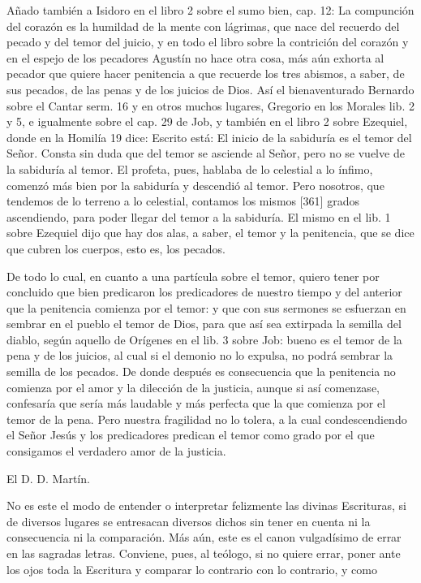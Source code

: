 Añado también a Isidoro en el libro 2 sobre el sumo bien, cap. 12: La compunción del corazón es la humildad de la mente con lágrimas, que nace del recuerdo del pecado y del temor del juicio, y en todo el libro sobre la contrición del corazón y en el espejo de los pecadores Agustín no hace otra cosa, más aún exhorta al pecador que quiere hacer penitencia a que recuerde los tres abismos, a saber, de sus pecados, de las penas y de los juicios de Dios. Así el bienaventurado Bernardo sobre el Cantar serm. 16 y en otros muchos lugares, Gregorio en los Morales lib. 2 y 5, e igualmente sobre el cap. 29 de Job, y también en el libro 2 sobre Ezequiel, donde en la Homilía 19 dice: Escrito está: El inicio de la sabiduría es el temor del Señor. Consta sin duda que del temor se asciende al Señor, pero no se vuelve de la sabiduría al temor. El profeta, pues, hablaba de lo celestial a lo ínfimo, comenzó más bien por la sabiduría y descendió al temor. Pero nosotros, que tendemos de lo terreno a lo celestial, contamos los mismos [361] grados ascendiendo, para poder llegar del temor a la sabiduría. El mismo en el lib. 1 sobre Ezequiel dijo que hay dos alas, a saber, el temor y la penitencia, que se dice que cubren los cuerpos, esto es, los pecados.

De todo lo cual, en cuanto a una partícula sobre el temor, quiero tener por concluido que bien predicaron los predicadores de nuestro tiempo y del anterior que la penitencia comienza por el temor: y que con sus sermones se esfuerzan en sembrar en el pueblo el temor de Dios, para que así sea extirpada la semilla del diablo, según aquello de Orígenes en el lib. 3 sobre Job: bueno es el temor de la pena y de los juicios, al cual si el demonio no lo expulsa, no podrá sembrar la semilla de los pecados. De donde después es consecuencia que la penitencia no comienza por el amor y la dilección de la justicia, aunque si así comenzase, confesaría que sería más laudable y más perfecta que la que comienza por el temor de la pena. Pero nuestra fragilidad no lo tolera, a la cual condescendiendo el Señor Jesús y los predicadores predican el temor como grado por el que consigamos el verdadero amor de la justicia.

El D. D. Martín.

No es este el modo de entender o interpretar felizmente las divinas Escrituras, si de diversos lugares se entresacan diversos dichos sin tener en cuenta ni la consecuencia ni la comparación. Más aún, este es el canon vulgadísimo de errar en las sagradas letras. Conviene, pues, al teólogo, si no quiere errar, poner ante los ojos toda la Escritura y comparar lo contrario con lo contrario, y como

